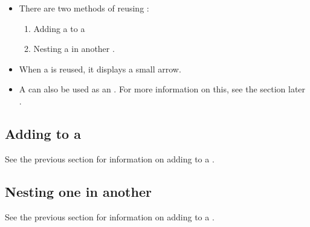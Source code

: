 % 
%
%
\label{reusability}
\begin{itemize}
\item There are two methods of reusing \gdcases{}:
\begin{enumerate}
\item Adding a \gdcase{} to a \gdsuite{}
\item Nesting a \gdcase{} in another \gdcase{}. 
\end{enumerate}
\item When a \gdcase{} is reused, it displays a small arrow. 
\item A \gdcase{} can also be used as an \gdehandler{}. For more information on this, see the section later .
\end{itemize}


\subsection{Adding \gdcases{} to a \gdsuite{}}
See the previous section for information on adding \gdcases{} to a \gdsuite{} .


\subsection{Nesting one \gdcase in another}
See the previous section for information on adding \gdcases{} to a \gdcase{} .


